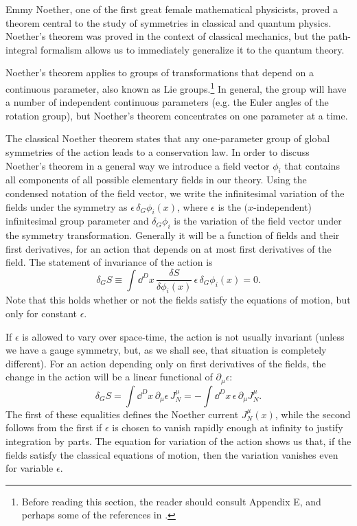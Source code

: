 
Emmy Noether, one of the first great female mathematical physicists, proved a
theorem central to the study of symmetries in classical and quantum physics.
Noether's theorem was proved in the context of classical mechanics, but the
path-integral formalism allows us to immediately generalize it to the quantum
theory.

Noether's theorem applies to groups of transformations that depend on a
continuous parameter, also known as Lie groups.\footnote[1]{Before reading
this section, the reader should consult Appendix E, and perhaps some of the
references in \cite{banks-ref-1,banks-ref-2,banks-ref-3,banks-ref-4}.} In general, the group will have a number of independent
continuous parameters (e.g. the Euler angles of the rotation group), but
Noether's theorem concentrates on one parameter at a time.

The classical Noether theorem states that any one-parameter group of global
symmetries of the action leads to a conservation law. In order to discuss
Noether's theorem in a general way we introduce a field vector $\phi_i$ that
contains all components of all possible elementary fields in our theory. Using
the condensed notation of the field vector, we write the infinitesimal variation
of the fields under the symmetry as $\epsilon\,\delta_G\phi_i(x)$, where
$\epsilon$ is the $(x$-independent) infinitesimal group parameter and
$\delta_G\phi_i$ is the variation of the field vector under the symmetry
transformation. Generally it will be a function of fields and their first
derivatives, for an action that depends on at most first derivatives of the
field. The statement of invariance of the action is
\begin{equation*}
  \delta_G S \equiv \int \dd^D x\,
  \frac{\delta S}{\delta\phi_i(x)}\,\epsilon\,\delta_G\phi_i(x)=0.
\end{equation*}
Note that this holds whether or not the fields satisfy the equations of motion,
but only for constant $\epsilon$.

If $\epsilon$ is allowed to vary over space-time, the action is not usually
invariant (unless we have a gauge symmetry, but, as we shall see, that situation
is completely different). For an action depending only on first derivatives of
the fields, the change in the action will be a linear functional of
$\partial_\mu\epsilon$:
\begin{equation*}
  \delta_G S=\int\dd^D x\,\partial_\mu\epsilon\,J_N^\mu
  =-\int\dd^D x\,\epsilon\,\partial_\mu J_N^\mu.
\end{equation*}
The first of these equalities defines the Noether current $J_N^\mu(x)$, while
the second follows from the first if $\epsilon$ is chosen to vanish rapidly
enough at infinity to justify integration by parts. The equation for variation
of the action shows us that, if the fields satisfy the classical equations of
motion, then the variation vanishes even for variable $\epsilon$.

